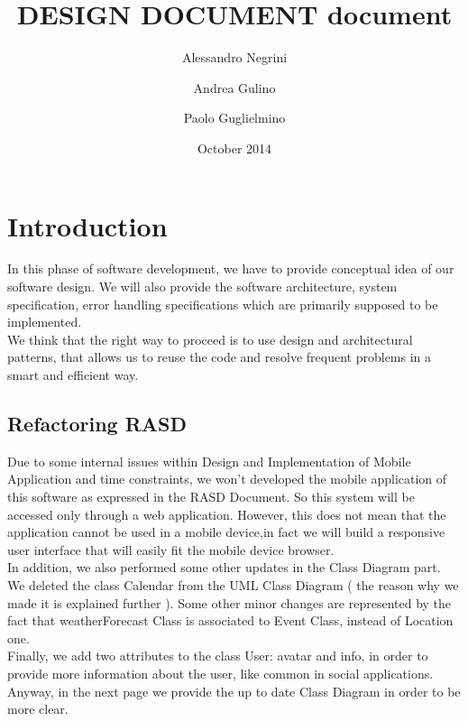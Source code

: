 \documentclass[12pt]{book}
\title{DESIGN DOCUMENT document}
\author{Alessandro Negrini \and Andrea Gulino \and Paolo Guglielmino}
\date{October 2014}
\begin{document}

\tableofcontents
\afterpage{\null\newpage}

\chapter{Introduction}

In this phase of software development, we have to provide conceptual idea of our software design. We will also provide the software architecture, system specification, error handling specifications which are primarily supposed to be implemented. \\
We think that the right way to proceed is to use design and architectural patterns, that allows us to reuse the code and resolve frequent problems in a smart and efficient way. \\

\section{Refactoring RASD}

Due to some internal issues within Design and Implementation of Mobile Application and time constraints, we won't developed the mobile application of this software as expressed in the RASD Document. So this system will be accessed only through a web application. However, this does not mean that the application cannot be used in a mobile device,in fact we will build a responsive user interface that will easily fit the mobile device browser. \\

In addition, we also performed some other updates in the Class Diagram part. 
We deleted the class Calendar from the UML Class Diagram ( the reason why we made it is explained further ). 
Some other minor changes are represented by the fact that weatherForecast Class is associated to Event Class, instead of Location one. \\
Finally, we add two attributes to the class User: avatar and info, in order to provide more information about the user, like common in social applications. \\
Anyway, in the next page we provide the up to date Class Diagram in order to be more clear. 
\end{document}
